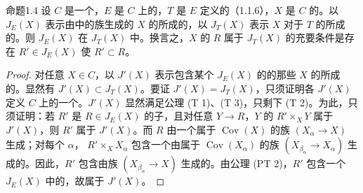 \begin{SGAresult}{命题}{1.4}
设 $C$ 是一个，$E$ 是 $C$ 上的，$T$ 是 $E$ 定义的（1.1.6），$X$ 是 $C$ 的。以 $J_E(X)$ 表示由中的族生成的 $X$ 的所成的，以 $J_T(X)$ 表示 $X$ 对于 $T$ 的所成的。则 $J_E(X)$ 在 $J_T(X)$ 中。换言之，$X$ 的 $R$ 属于 $J_T(X)$ 的充要条件是存在 $R'\in J_E(X)$ 使 $R'\subset R$。
\end{SGAresult}
\begin{proof}
对任意 $X\in C$，以 $J'(X)$ 表示包含某个 $J_E(X)$ 的的那些 $X$ 的所成的。显然有 $J'(X)\subset J_T(X)$。要证 $J'(X)=J_T(X)$，只须证明各 $J'(X)$ 定义 $C$ 上的一个。$J'(X)$ 显然满足公理 (T 1)、(T 3)，只剩下 (T 2)。为此，只须证明：若 $R'$ 是 $R\in J_E(X)$ 的子，且对任意 $Y\to R$，$Y$ 的 $R'\times_XY$ 属于 $J'(X)$，则 $R'$ 属于 $J'(X)$。而 $R$ 由一个属于 $\operatorname{Cov}(X)$ 的族 $(X_\alpha\to X)$ 生成；对每个 $\alpha$， $R'\times_XX_\alpha$ 包含一个由属于 $\operatorname{Cov}(X_\alpha)$ 的族 $(X_{\beta_\alpha}\to X_\alpha)$ 生成的。因此，$R'$ 包含由族 $(X_{\beta_\alpha}\to X)$ 生成的。由公理 (PT 2)，$R'$ 包含一个 $J_E(X)$ 中的，故属于 $J'(X)$。
\end{proof}

